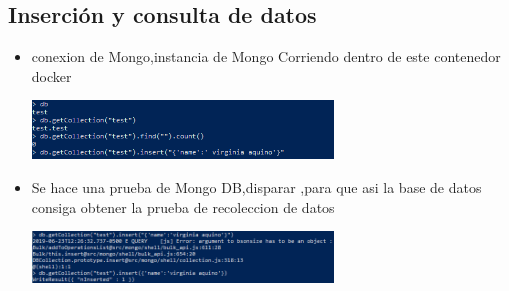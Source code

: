 \documentclass[%
 reprint,
 amsmath,amssymb,
 aps,
]{revtex4-1}
\begin{document}
\subsection{Inserción y consulta de datos}
                     \begin{itemize}
		\item conexion de Mongo,instancia de Mongo Corriendo dentro de este contenedor docker 
                      \begin{center}
		\includegraphics[width=8cm]{./Imagenes/26}
		\end{center}	
		\item Se hace una prueba de Mongo DB,disparar ,para que asi  la base de datos consiga obtener la prueba de recoleccion de datos 
                     \begin{center}
		\includegraphics[width=8cm]{./Imagenes/27}
		\end{center}	
                  
	          \end{itemize}
\end{document}
